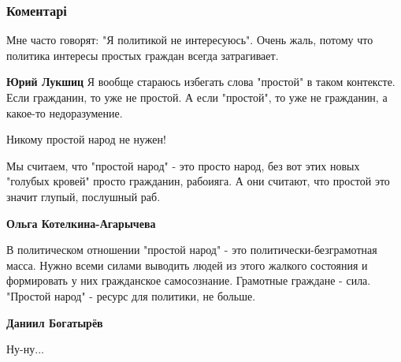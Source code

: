  
 
 
 
 
\subsubsection{Коментарі}

\begin{itemize} %
Мне часто говорят: "Я политикой не интересуюсь". Очень жаль, потому что политика интересы простых граждан всегда затрагивает.

\begin{itemize} %
\textbf{Юрий Лукшиц} Я вообще стараюсь избегать слова "простой" в таком контексте. Если гражданин, то уже не простой. А если "простой", то уже не гражданин, а какое-то недоразумение.
\end{itemize} %

Никому простой народ не нужен!


Мы считаем, что "простой народ" - это просто народ, без вот этих новых "голубых
кровей" просто гражданин, рабоияга. А они считают, что простой это значит
глупый, послушный раб.

\begin{itemize} %
\textbf{Ольга Котелкина-Агарычева} 

В политическом отношении "простой народ" - это политически-безграмотная масса.
Нужно всеми силами выводить людей из этого жалкого состояния и формировать у
них гражданское самосознание. Грамотные граждане - сила. "Простой народ" -
ресурс для политики, не больше.


\textbf{Даниил Богатырёв}


Ну-ну...


\end{itemize}
\end{itemize}
